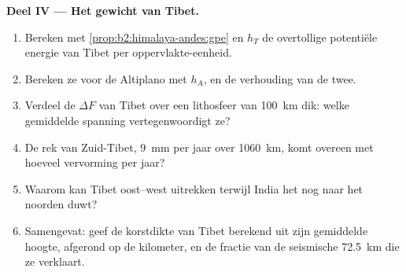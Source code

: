 \begin{problem}
\noindent\textbf{Deel IV --- Het gewicht van Tibet.}
\begin{enumerate}[resume]
\item Bereken met \cref{prop:b2:himalaya-andes:gpe} en $h_T$ de overtollige potentiële
energie van Tibet per oppervlakte-eenheid.
\item Bereken ze voor de Altiplano met $h_A$, en de verhouding van de twee.
\item Verdeel de $\Delta F$ van Tibet over een lithosfeer van \qty{100}{km} dik: welke gemiddelde spanning
vertegenwoordigt ze?
\item De rek van Zuid-Tibet, \qty{9}{mm} per jaar over \qty{1060}{km}, komt overeen met hoeveel
vervorming per jaar?
\item Waarom kan Tibet oost--west uitrekken terwijl India het nog naar het noorden duwt?
\item Samengevat: geef de korstdikte van Tibet berekend uit zijn gemiddelde hoogte, afgerond
op de kilometer, en de fractie van de seismische \qty{72.5}{km} die ze verklaart.
\end{enumerate}
\end{problem}
